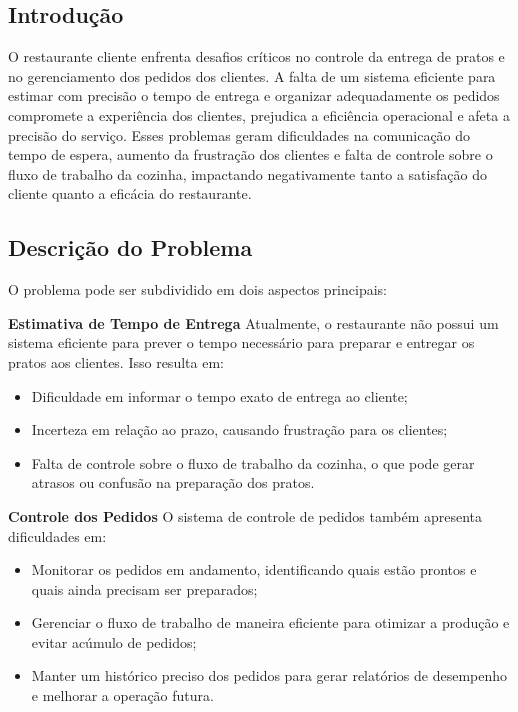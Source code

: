 \hspace{4.5mm}
\subsection{Introdução} O restaurante cliente enfrenta desafios críticos no controle da entrega de pratos e no gerenciamento dos pedidos dos clientes. A falta de um sistema eficiente para estimar com precisão o tempo de entrega e organizar adequadamente os pedidos compromete a experiência dos clientes, prejudica a eficiência operacional e afeta a precisão do serviço. Esses problemas geram dificuldades na comunicação do tempo de espera, aumento da frustração dos clientes e falta de controle sobre o fluxo de trabalho da cozinha, impactando negativamente tanto a satisfação do cliente quanto a eficácia do restaurante.

\subsection{Descrição do Problema} O problema pode ser subdividido em dois aspectos principais:

\textbf{Estimativa de Tempo de Entrega} Atualmente, o restaurante não possui um sistema eficiente para prever o tempo necessário para preparar e entregar os pratos aos clientes. Isso resulta em: 
\begin{itemize} 
    \item Dificuldade em informar o tempo exato de entrega ao cliente; 
    \item Incerteza em relação ao prazo, causando frustração para os clientes; 
    \item Falta de controle sobre o fluxo de trabalho da cozinha, o que pode gerar atrasos ou confusão na preparação dos pratos. 
\end{itemize}

\textbf{Controle dos Pedidos} O sistema de controle de pedidos também apresenta dificuldades em: 
\begin{itemize} 
    \item Monitorar os pedidos em andamento, identificando quais estão prontos e quais ainda precisam ser preparados; 
    \item Gerenciar o fluxo de trabalho de maneira eficiente para otimizar a produção e evitar acúmulo de pedidos; 
    \item Manter um histórico preciso dos pedidos para gerar relatórios de desempenho e melhorar a operação futura. 
\end{itemize}

